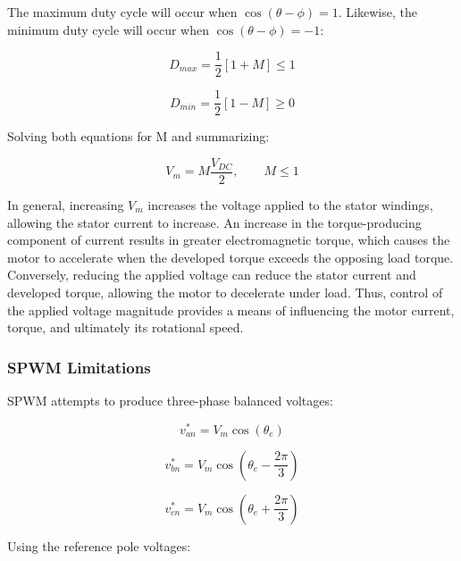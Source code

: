 \documentclass{article}
\begin{document}
The maximum duty cycle will occur when $\cos(\theta - \phi) = 1$. Likewise, the minimum duty cycle will occur when $\cos(\theta - \phi) = -1$:

\begin{equation}
    D_{max} = \frac{1}{2}[1 + M] \leq 1
\end{equation}

\begin{equation}
    D_{min} = \frac{1}{2}[1 - M] \geq 0
\end{equation}

Solving both equations for M and summarizing:

\begin{equation}
    V_m = M\frac{V_{DC}}{2}, \qquad
    M \leq 1
\end{equation}

In general, increasing $V_m$ increases the voltage applied to the stator windings, allowing the stator current to increase. An increase in the torque-producing component of current results in greater electromagnetic torque, which causes the motor to accelerate when the developed torque exceeds the opposing load torque. Conversely, reducing the applied voltage can reduce the stator current and developed torque, allowing the motor to decelerate under load. Thus, control of the applied voltage magnitude provides a means of influencing the motor current, torque, and ultimately its rotational speed.


\subsubsection{SPWM Limitations}

SPWM attempts to produce three-phase balanced voltages:

\begin{equation}
    v_{an}^* = V_m\cos(\theta_e)
\end{equation}

\begin{equation}
    v_{bn}^* = V_m\cos(\theta_e - \frac{2\pi}{3})
\end{equation}

\begin{equation}
    v_{cn}^* = V_m\cos(\theta_e + \frac{2\pi}{3})
\end{equation}

Using the reference pole voltages:
\end{document}
